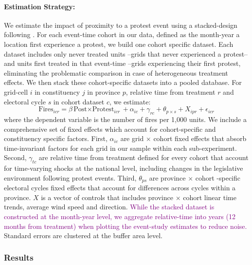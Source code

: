 \documentclass[12pt]{article}
\begin{document}
\paragraph{Estimation Strategy:}
We estimate the impact of proximity to a protest event using a stacked-design following \citet{cengiz2019effect}. For each event-time cohort in our data, defined as the month-year a location first experience a protest, we build one cohort specific dataset. Each dataset includes only never treated units --grids that never experienced a protest-- and units first treated in that event-time --grids experiencing their first protest, eliminating the problematic comparison in case of heterogeneous treatment effects. We then stack these cohort-specific datasets into a pooled database. For grid-cell $i$ in constituency $j$ in province $p$, relative time from treatment $r$ and electoral cycle $s$ in cohort dataset $c$, we estimate: %
\begin{equation}\label{eq_protest}
 { \text{Fires} }_{i c r}=\beta {\text{Post$\times$Protest}}_{i c r}+ \alpha_{ic}+ \gamma_{rc} + \theta_{p \times s}+ X_{ipr} + \epsilon_{icr}
\end{equation}
where the dependent variable is the number of fires per 1,000 units. We include a comprehensive set of fixed effects which account for cohort-specific and constituency specific factors. First, $\alpha_{ic}$ are grid $\times$ cohort fixed effects that absorb time-invariant factors for each grid in our sample within each sub-experiment. Second, $\gamma_{tc}$ are relative time from treatment defined for every cohort that account for time-varying shocks at the national level, including changes in the legislative environment following protest events. Third, $\theta_{ps}$ are province $\times$ cohort -specific electoral cycles fixed effects that account for differences across cycles within a province. $X$ is a vector of controls that includes province $\times$ cohort  linear time trends, average wind speed and direction. \textcolor{purple}{While the stacked dataset is constructed at the month-year level, we aggregate relative-time into years (12 months from treatment) when plotting the event-study estimates to reduce noise.} Standard errors are clustered at the buffer area level.

\subsubsection{Results\label{sssec:results2}}
\end{document}
